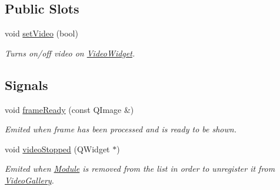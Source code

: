 \subsection*{Public Slots}
\begin{DoxyCompactItemize}
\item 
void \hyperlink{class_module_a44b6835871fe594af9e8b687ca3f349f}{setVideo} (bool)
\begin{DoxyCompactList}\small\item\em Turns on/off video on \hyperlink{class_video_widget}{VideoWidget}. \item\end{DoxyCompactList}\end{DoxyCompactItemize}
\subsection*{Signals}
\begin{DoxyCompactItemize}
\item 
void \hyperlink{class_module_a216ad8e0b35bdcc51a37ea40aa3bfdcf}{frameReady} (const QImage \&)
\begin{DoxyCompactList}\small\item\em Emited when frame has been processed and is ready to be shown. \item\end{DoxyCompactList}\item 
void \hyperlink{class_module_abd2a5a79ff77212c6730767dc7d5d49d}{videoStopped} (QWidget $\ast$)
\begin{DoxyCompactList}\small\item\em Emited when \hyperlink{class_module}{Module} is removed from the list in order to unregister it from \hyperlink{class_video_gallery}{VideoGallery}. \item\end{DoxyCompactList}\end{DoxyCompactItemize}
